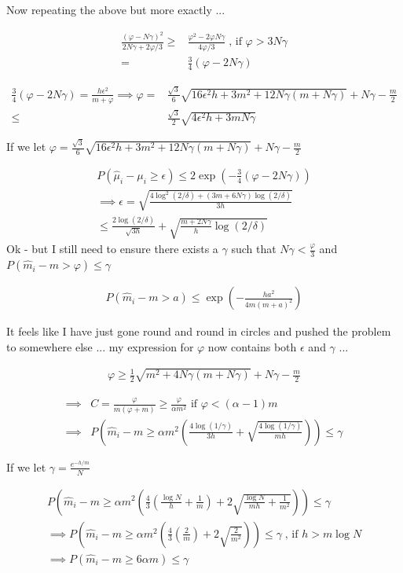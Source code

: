 \documentclass{article}
\newcommand{\eqn}[1]{\begin{align}#1\end{align}}
\theoremstyle{plain}
\theoremstyle{definition}
\begin{document}
\begin{itemize}
Now repeating the above but more exactly ...

\eqn{
\frac{(\varphi-N\gamma)^2}{2N\gamma + 2\varphi/3}  \geq & \frac{\varphi^2-2\varphi N\gamma}{4\varphi/3} \; \text{, if } \varphi > 3N\gamma \\
= & \frac{3}{4}(\varphi - 2N\gamma)
}

\eqn{
\frac{3}{4}(\varphi - 2N\gamma) = \frac{h\epsilon^2}{m+\varphi} \implies \varphi = &\frac{\sqrt{3}}{6}\sqrt{16\epsilon^2 h+3m^2+12N\gamma(m+N\gamma)} + N\gamma - \frac{m}{2}\\
\leq & \frac{\sqrt{3}}{2}\sqrt{4\epsilon^2 h+3mN\gamma}
}

If we let $\varphi =\frac{\sqrt{3}}{6}\sqrt{16\epsilon^2 h+3m^2+12N\gamma(m+N\gamma)} + N\gamma - \frac{m}{2} $

\eqn{
P(\hat{\mu}_i-\mu_i \geq \epsilon) \leq 2\exp(-\frac{3}{4}(\varphi - 2N\gamma))\\
\implies \epsilon = \sqrt{\frac{4\log^2(2/\delta)+(3m+6N\gamma)\log(2/\delta)}{3h}}\\
\leq \frac{2\log(2/\delta)}{\sqrt{3h}}+\sqrt{\frac{m+2N\gamma}{h}\log(2/\delta)}
}
Ok - but I still need to ensure there exists a $\gamma$ such that  $N\gamma < \frac{\varphi}{3}$ and $P(\hat{m}_i - m > \varphi) \leq \gamma$

\eqn{
P(\hat{m}_i - m > a) \leq \exp(-\frac{h a^2}{4m(m+a)^2})
}


It feels like I have just gone round and round in circles and pushed the problem to somewhere else ... my expression for $\varphi$ now contains both $\epsilon$ and $\gamma$ ...

\eqn{
\varphi \geq \frac{1}{2}\sqrt{m^2+4N\gamma(m+N\gamma)} + N\gamma - \frac{m}{2}
}





\end{itemize}





\pagebreak

\eqn{
 \implies & C = \frac{\varphi}{m(\varphi+m)}  \geq \frac{\varphi}{\alpha m^2} \text{ if } \varphi < (\alpha-1)m\\
\implies & P\left(\hat{m}_i - m \geq \alpha m^2 \left( \frac{4\log(1/\gamma)}{3h}+\sqrt{\frac{4\log(1/\gamma)}{mh}} \right)\right) \leq \gamma
}

If we let $\gamma = \frac{e^{-h/m}}{N}$

\eqn{
P\left(\hat{m}_i - m \geq \alpha m^2 \left( \frac{4}{3}(\frac{\log N}{h}+\frac{1}{m})+2\sqrt{\frac{\log N}{mh}+\frac{1}{m^2}} \right)\right) \leq \gamma \\
\implies P\left(\hat{m}_i - m \geq \alpha m^2 \left( \frac{4}{3}(\frac{2}{m})+2\sqrt{\frac{2}{m^2}} \right)\right) \leq \gamma \; \text{, if } h > m\log N \\
\implies P\left(\hat{m}_i - m \geq 6\alpha m \right) \leq \gamma
}
\end{document}
